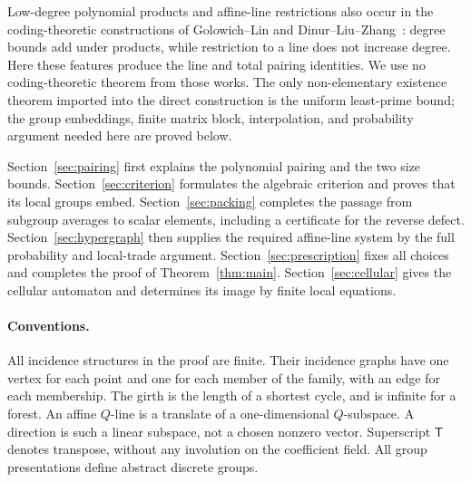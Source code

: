 Low-degree polynomial products and affine-line restrictions also occur in the coding-theoretic constructions of Golowich--Lin and Dinur--Liu--Zhang~\cite{GolowichLin2024,DinurLiuZhang2025}: degree bounds add under products, while restriction to a line does not increase degree. Here these features produce the line and total pairing identities. We use no coding-theoretic theorem from those works. The only non-elementary existence theorem imported into the direct construction is the uniform least-prime bound; the group embeddings, finite matrix block, interpolation, and probability argument needed here are proved below.

Section~\ref{sec:pairing} first explains the polynomial pairing and the two size bounds. Section~\ref{sec:criterion} formulates the algebraic criterion and proves that its local groups embed. Section~\ref{sec:packing} completes the passage from subgroup averages to scalar elements, including a certificate for the reverse defect. Section~\ref{sec:hypergraph} then supplies the required affine-line system by the full probability and local-trade argument. Section~\ref{sec:prescription} fixes all choices and completes the proof of Theorem~\ref{thm:main}. Section~\ref{sec:cellular} gives the cellular automaton and determines its image by finite local equations.

\paragraph{Conventions.}
All incidence structures in the proof are finite. Their incidence graphs have one vertex for each point and one for each member of the family, with an edge for each membership. The girth is the length of a shortest cycle, and is infinite for a forest. An affine $Q$-line is a translate of a one-dimensional $Q$-subspace. A direction is such a linear subspace, not a chosen nonzero vector. Superscript $\mathsf T$ denotes transpose, without any involution on the coefficient field. All group presentations define abstract discrete groups.
